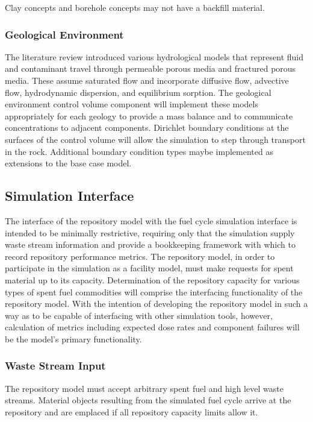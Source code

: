 Clay concepts and borehole concepts may not have a backfill material. 


\subsubsection{Geological Environment}

The literature review introduced various hydrological models that represent
fluid and contaminant travel through permeable porous media and fractured porous 
media. These assume saturated flow and incorporate diffusive flow, advective 
flow, hydrodynamic dispersion, and equilibrium sorption. The geological 
environment control volume component will implement these models appropriately 
for each geology to provide a mass balance and to communicate concentrations to  
adjacent components.  Dirichlet boundary conditions at the surfaces of the 
control volume will allow the simulation to step through transport in the rock. 
Additional boundary condition types maybe implemented as extensions to the base 
case model.


\subsection{Simulation Interface}

The interface of the repository model with the \Cyclus fuel cycle 
simulation interface is intended to be minimally restrictive, 
requiring only that the simulation supply waste stream information and 
provide a bookkeeping framework with which to record repository 
performance metrics. The repository model, in order to participate in the 
simulation as a facility model, must make requests for spent material up 
to its capacity. Determination of the repository capacity for various 
types of spent fuel commodities will comprise the interfacing functionality of 
the repository model. With the intention of developing the repository model in 
such a way as to be capable of interfacing with other simulation tools, however, 
calculation of metrics including expected dose rates and 
component failures will be the model's primary functionality. 

\subsubsection{Waste Stream Input}

The repository model must accept arbitrary spent fuel and high level waste
streams.  Material objects resulting from the simulated fuel cycle arrive at 
the  repository and are emplaced if all repository capacity limits allow 
it.

